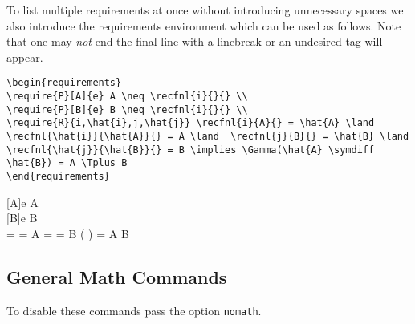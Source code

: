 \documentclass[leqno,11pt]{amsart}
\begin{document}
To list multiple requirements at once without introducing unnecessary spaces we also introduce the requirements environment which can be used as follows.  Note that one may \textit{not} end the final line with a linebreak or an undesired tag will appear.

\begin{lstlisting}[breaklines]
\begin{requirements}
\require{P}[A]{e} A \neq \recfnl{i}{}{} \\
\require{P}[B]{e} B \neq \recfnl{i}{}{} \\
\require{R}{i,\hat{i},j,\hat{j}} \recfnl{i}{A}{} = \hat{A} \land \recfnl{\hat{i}}{\hat{A}}{} = A \land  \recfnl{j}{B}{} = \hat{B} \land \recfnl{\hat{j}}{\hat{B}}{} = B \implies \Gamma(\hat{A} \symdiff \hat{B}) = A \Tplus B 
\end{requirements}
\end{lstlisting}

\begin{requirements}
[A]{e} A \neq {} \\
[B]{e} B \neq {} \\
  =  \land {} = A \land  {} =  \land {} = B \implies \Gamma( \symdiff {}) = A \Tplus B 
\end{requirements}




\subsection{General Math Commands}
To disable these commands pass the option \verb=nomath=. \\
\end{document}
